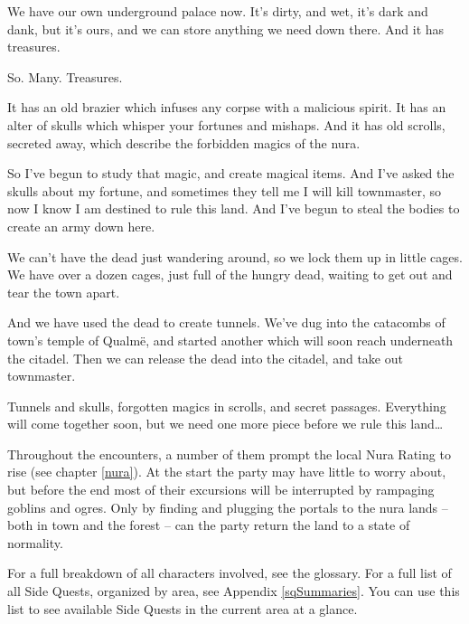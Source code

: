 \begin{multicols}{2}
\begin{exampletext}
  We have our own underground palace now.
  It's dirty, and wet, it's dark and dank, but it's ours, and we can store anything we need down there.
  And it has treasures.

  So. Many. Treasures.

  It has an old brazier which infuses any corpse with a malicious spirit.
  It has an alter of skulls which whisper your fortunes and mishaps.
  And it has old scrolls, secreted away, which describe the forbidden magics of the nura.
  
  So I've begun to study that magic, and create magical items.
  And I've asked the skulls about my fortune, and sometimes they tell me I will kill \gls{townmaster}, so now I know I am destined to rule this land.
  And I've begun to steal the bodies to create an army down here.

  We can't have the dead just wandering around, so we lock them up in little cages.
  We have over a dozen cages, just full of the hungry dead, waiting to get out and tear the town apart.

  And we have used the dead to create tunnels.
  We've dug into the catacombs of \gls{town}'s temple of Qualm\"{e}, and started another which will soon reach underneath the citadel.
  Then we can release the dead into the citadel, and take out \gls{townmaster}.

  Tunnels and skulls, forgotten magics in scrolls, and secret passages.
  Everything will come together soon, but we need one more piece before we rule this land\ldots

\end{exampletext}

Throughout the encounters, a number of them prompt the local Nura Rating to rise (see chapter \ref{nura}).
At the start the party may have little to worry about, but before the end most of their excursions will be interrupted by rampaging goblins and ogres.
Only by finding and plugging the portals to the nura lands -- both in \gls{town} and the forest -- can the party return the land to a state of normality.

For a full breakdown of all characters involved, see the glossary.
For a full list of all Side Quests, organized by area, see Appendix \ref{sqSummaries}.
You can use this list to see available Side Quests in the current area at a glance.

\end{multicols}

